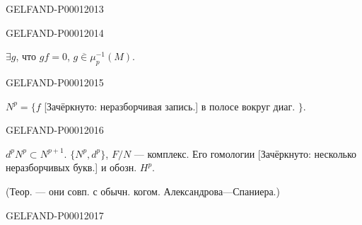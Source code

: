 \begin{GelfandAdjacentEvidence}{GELFAND-P000120}{13}

\end{GelfandAdjacentEvidence}
\begin{GelfandAdjacentEvidence}{GELFAND-P000120}{14}

$\exists g$, что $gf=0$, $g\overline{\in}\mu_p^{-1}(M)$.
\end{GelfandAdjacentEvidence}
\begin{GelfandAdjacentEvidence}{GELFAND-P000120}{15}

$N^p=\{f$ [Зачёркнуто: неразборчивая запись.] в полосе вокруг диаг. $\}$.
\end{GelfandAdjacentEvidence}
\begin{GelfandAdjacentEvidence}{GELFAND-P000120}{16}

$d^pN^p\subset N^{p+1}$.
$\{N^p,d^p\}$, $F/N$ — комплекс.
Его гомологии [Зачёркнуто: несколько неразборчивых букв.] и обозн. $H^p$.

(Теор. — они совп. с обычн. когом. Александрова—Спаниера.)
\end{GelfandAdjacentEvidence}
\begin{GelfandAdjacentEvidence}{GELFAND-P000120}{17}


\end{GelfandAdjacentEvidence}



